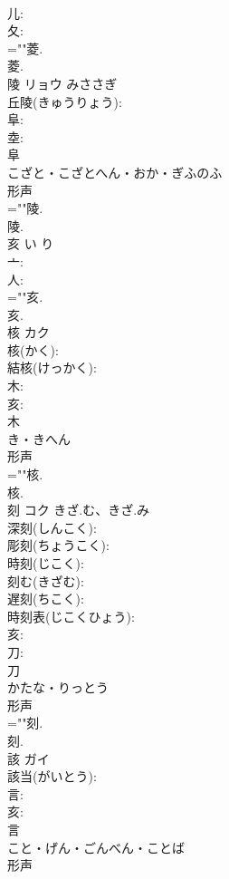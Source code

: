\documentclass[8pt]{extreport}
\begin{document}
\begin{CJK}{UTF8}{min}
\\	儿: 
\\	夂: 
\\	=""菱.
\\	菱.
\\	陵	リョウ	みささぎ		
\\	丘陵(きゅうりょう): 
\\	阜: 
\\	坴: 
\\	阜	
\\	こざと・こざとへん・おか・ぎふのふ	
\\	形声 
\\	=""陵.
\\	陵.
\\	亥		い	り			
\\	亠: 
\\	人: 
\\	=""亥.
\\	亥.
\\	核	カク			
\\	核(かく): 
\\	結核(けっかく): 
\\	木: 
\\	亥: 
\\	木	
\\	き・きへん	
\\	形声 
\\	=""核.
\\	核.
\\	刻	コク	きざ.む、きざ.み		
\\	深刻(しんこく): 
\\	彫刻(ちょうこく): 
\\	時刻(じこく): 
\\	刻む(きざむ): 
\\	遅刻(ちこく): 
\\	時刻表(じこくひょう): 
\\	亥: 
\\	刀: 
\\	刀	
\\	かたな・りっとう	
\\	形声 
\\	=""刻.
\\	刻.
\\	該	ガイ			
\\	該当(がいとう): 
\\	言: 
\\	亥: 
\\	言	
\\	こと・げん・ごんべん・ことば	
\\	形声 

\end{CJK}
\end{document}
